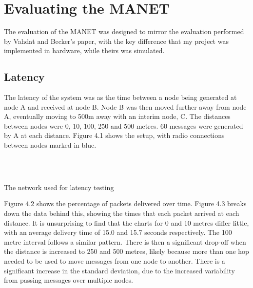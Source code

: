 \documentclass[12pt,a4paper]{report}
\makeatletter
\newenvironment{figurehere}
  {\def\@captype{figure}}
  {}
\makeatother
\begin{document}
\section{Evaluating the MANET}
The evaluation of the MANET was designed to mirror the evaluation performed by Vahdat and Becker's paper, with the key difference that my project was implemented in hardware, while theirs was simulated. \\

\subsection{Latency}
The latency of the system was as the time between a node being generated at node A and received at node B. Node B was then moved further away from node A, eventually moving to 500m away with an interim node, C. The distances between nodes were 0, 10, 100, 250 and 500 metres. 60 messages were generated by A at each distance. Figure 4.1 shows the setup, with radio connections between nodes marked in blue. \\ \\ 
\begin{figurehere}
\begin{center}
 \\
\end{center}
\caption{The network used for latency testing}
\end{figurehere}
\FloatBarrier
\bigskip
Figure 4.2 shows the percentage of packets delivered over time. Figure 4.3 breaks down the data behind this, showing the times that each packet arrived at each distance. It is unsurprising to find that the charts for 0 and 10 metres differ little, with an average delivery time of 15.0 and 15.7 seconds respectively. The 100 metre interval follows a similar pattern. There is then a significant drop-off when the distance is increased to 250 and 500 metres, likely because more than one hop needed to be used to move messages from one node to another. There is a significant increase in the standard deviation, due to the increased variability from passing messages over multiple nodes. \\ \\
\end{document}
